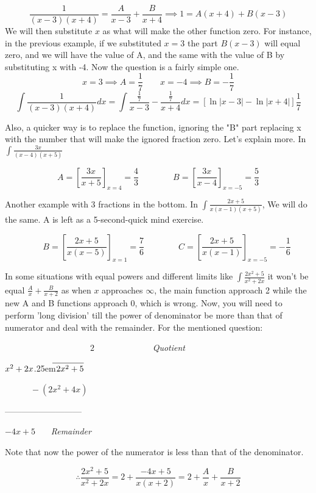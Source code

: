 \documentclass{article}
\newcommand\longdiv[2]{%
	$\strut#1$\kern.25em\smash{\raise.3ex\hbox{$\big)$}}$\mkern-8mu
	\overline{\enspace\strut#2}$}
\begin{document}
	\[
		\frac{1}{(x-3)(x+4)} = \frac{A}{x-3} + \frac{B}{x+4} \implies 1=A(x+4)+B(x-3)
	\]
	We will then substitute $ x $ as what will make the other function zero. For instance, in the previous example, if we substituted $ x = 3 $ the part $ B(x-3) $ will equal zero, and we will have the value of A, and the same with the value of B by substituting x with -4. 
	Now the question is a fairly simple one.
	\[
		x=3 \implies A = \frac{1}{7} \qquad x=-4 \implies B =-\frac{1}{7}
	\]
	\[
		\int \frac{1}{(x-3)(x+4)} dx = \int \frac{ \frac{1}{7} }{ x-3 } - \frac{ \frac{1}{7} }{ x+4 } dx
		=[ \ln{|x-3|} - \ln{|x+4|} ] \frac{1}{7}
	\]

	Also, a quicker way is to replace the function, ignoring the "B" part replacing x with the number that will make the ignored fraction zero. Let's explain more.
	In $\int \frac{3x}{(x-4)(x+5)} $

	\[
		A = \left [ \frac{3x}{x+5} \right ]  _{x=4}
		= \frac{4}{3} \qquad \qquad B = \left [ \frac{3x}{x-4} \right ] _{x=-5} = \frac{5}{3}
	\]

	Another example with 3 fractions in the bottom. In $\int \frac{ 2x+5 }{ x(x-1)(x+5) }$, We will do the same. A is left as a 5-second-quick mind exercise.

	\[
		\qquad B = \left [ \frac{ 2x+5 }{ x(x-5) }    \right ]_{x=1} = \frac{7}{6} \qquad \qquad C = \left [ \frac{ 2x+5 }{ x(x-1) }   \right ]_{x=-5} = -\frac{1}{6} 
	\]

	In some situations with equal powers and different limits like $ \int \frac{ 2x^2+5 }{ x^2+2x }  $ it won't be equal $ \frac{A}{x} + \frac{B}{x+2} $ as when $ x $ approaches $ \infty $, the main function approach 2 while the new A and B functions approach 0, which is wrong. Now, you will need to perform 'long division' till the power of denominator be more than that of numerator and deal with the remainder. For the mentioned question: 
	\begin{center}

		$ \qquad \qquad \qquad \qquad  \qquad  2 $ \ \ \ \ \ \ \ \ \ \ \ \ \ \it{Quotient} \

		\longdiv{x^2+2x}{2x^2+5}

		$ \qquad  \quad -(2x^2+4x) $

		---------------------------

		\qquad \qquad \qquad \qquad \qquad 	$ -4x+5  $ \ \ \ \it{Remainder}

		Note that now the power of the numerator is less than that of the denominator.

		\[	
		\therefore \frac{ 2x^2 + 5 }{x^2+2x} =  2 + \frac{ -4x+5 }{ x(x+2) }
		= 2 + \frac{A}{x} + \frac{ B }{ x+2 } 
		\] 

	\end{center}
\end{document}
